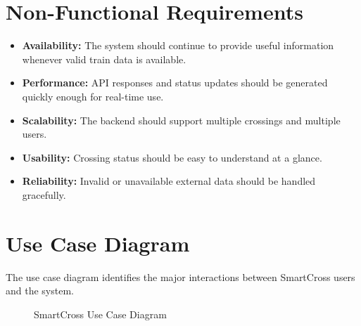 \documentclass[12pt,a4paper]{report}
\begin{document}
\section{Non-Functional Requirements}

\begin{itemize}
  \item \textbf{Availability:} The system should continue to provide useful
        information whenever valid train data is available.
  \item \textbf{Performance:} API responses and status updates should be generated
        quickly enough for real-time use.
  \item \textbf{Scalability:} The backend should support multiple crossings and
        multiple users.
  \item \textbf{Usability:} Crossing status should be easy to understand at a
        glance.
  \item \textbf{Reliability:} Invalid or unavailable external data should be
        handled gracefully.
\end{itemize}


\section{Use Case Diagram}

The use case diagram identifies the major interactions between SmartCross users
and the system.

\begin{figure}[H]
\centering
{}
\caption{SmartCross Use Case Diagram}
\label{fig:usecase}
\end{figure}
\end{document}
